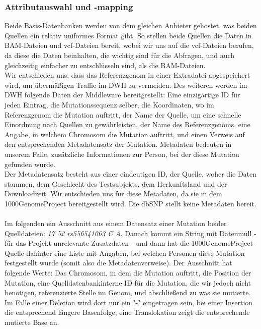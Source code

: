 \subsubsection{Attributauswahl und -mapping}
Beide Basis-Datenbanken werden von dem gleichen Anbieter gehostet, was beiden Quellen ein relativ uniformes Format gibt. So stellen beide Quellen die Daten in BAM-Dateien und vcf-Dateien bereit, wobei wir uns auf die vcf-Dateien berufen, da diese die Daten beinhalten, die wichtig sind für die Abfragen, und auch gleichzeitig einfacher zu entschlüsseln sind, als die BAM-Dateien.\\
Wir entschieden uns, dass das Referenzgenom in einer Extradatei abgespeichert wird, um übermäßigen Traffic im DWH zu vermeiden. Des weiteren werden im DWH folgende Daten der Middleware bereitgestellt: Eine einzigartige ID für jeden Eintrag, die Mutationssequenz selber, die Koordinaten, wo im Referenzgenom die Mutation auftritt, der Name der Quelle, um eine schnelle Einordnung nach Quellen zu gewährleisten, der Name des Referenzgenoms, eine Angabe, in welchem Chromosom die Mutation auftritt, und einen Verweis auf den entsprechenden Metadatensatz der Mutation. Metadaten bedeuten in unserem Falle, zusätzliche Informationen zur Person, bei der diese Mutation gefunden wurde.\\
Der Metadatensatz besteht aus einer eindeutigen ID, der Quelle, woher die Daten stammen, dem Geschlecht des Testsubjekts, dem Herkunftsland und der Downloadzeit. Wir entschieden uns für diese Metadaten, da sie in dem 1000GenomeProject bereitgestellt wird. Die dbSNP stellt keine Metadaten bereit.\\
\\
Im folgenden ein Ausschnitt aus einem Datensatz einer Mutation beider Quelldateien: \textit{17	52	rs556541063	C	A}. Danach kommt ein String mit Datenmüll - für das Projekt unrelevante Zusatzdaten - und dann hat die 1000GenomeProject-Quelle dahinter eine Liste mit Angaben, bei welchen Personen diese Mutation festgestellt wurde (somit also die Metadatenverweise). Der Ausschnitt hat folgende Werte: Das Chromosom, in dem die Mutation auftritt, die Position der Mutation, eine Quelldatenbankinterne ID für die Mutation, die wir jedoch nicht benötigen, referenzierte Stelle im Genom, und abschließend zu was sie mutierte. Im Falle einer Deletion wird dort nur ein "-" eingetragen sein, bei einer Insertion die entsprechend längere Basenfolge, eine Translokation zeigt die entsprechende mutierte Base an.
